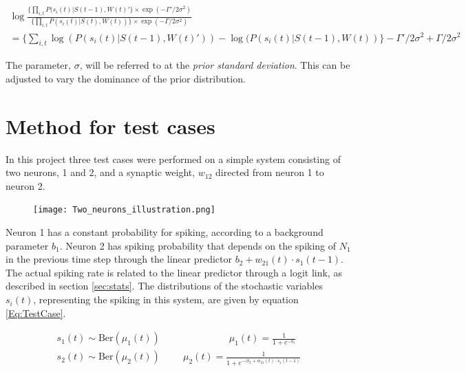 \begin{equation}
\label{eq:ratio}
\begin{split}
    \log \frac{\big \{ \prod_{i,t} P(s_{i}(t)|S(t-1), W(t)'\big \} \times \exp(-\Gamma' /2\sigma^2)}{\big \{ \prod_{i,t}  P(s_{i}(t)|S(t), W(t)) \big \} \times \exp(-\Gamma /2\sigma^2)} \\
    = \Big \{ \sum_{i,t} \log( P(s_{i}(t)|S(t-1), W(t)')) - \log( P(s_{i}(t)|S(t-1), W(t)) \Big \} -\Gamma' /2\sigma^2 +  \Gamma /2\sigma^2
\end{split}
\end{equation}

The parameter, $\sigma$, will be referred to at the \textit{prior standard deviation}. This can be adjusted to vary the dominance of the prior distribution. 


\section{Method for test cases}
\label{Method}

In this project three test cases were performed on a simple system consisting of two neurons, 1 and 2, and a synaptic weight, $w_{12}$ directed from neuron 1 to neuron 2.

\begin{figure}[h]
    \centering
    \texttt{[image: Two\_neurons\_illustration.png]}
\end{figure}

Neuron 1 has a constant probability for spiking, according to a background parameter $b_1$. Neuron 2 has spiking probability that depends on the spiking of $N_1$ in the previous time step through the linear predictor $b_2 + w_{21}(t) \cdot s_{1}(t-1)$. The actual spiking rate is related to the linear predictor through a logit link, as described in section \ref{sec:stats}. The distributions of the stochastic variables $s_{i}(t)$, representing the spiking in this system, are given by equation \ref{Eq:TestCase}.

\begin{equation}
\begin{split}
\label{Eq:TestCase}
    s_{1}(t) \sim \text{Ber}(\mu_{1}(t)) \hspace{3cm} \mu_{1}(t)= \frac{1}{1+e^{-b_1}} \\
    s_{2}(t) \sim \text{Ber}(\mu_{2}(t)) \hspace{1cm} \mu_{2}(t)= \frac{1}{1+e^{-(b_2 + w_{21}(t) \cdot s_{1}(t-1)}}
\end{split}
\end{equation}

